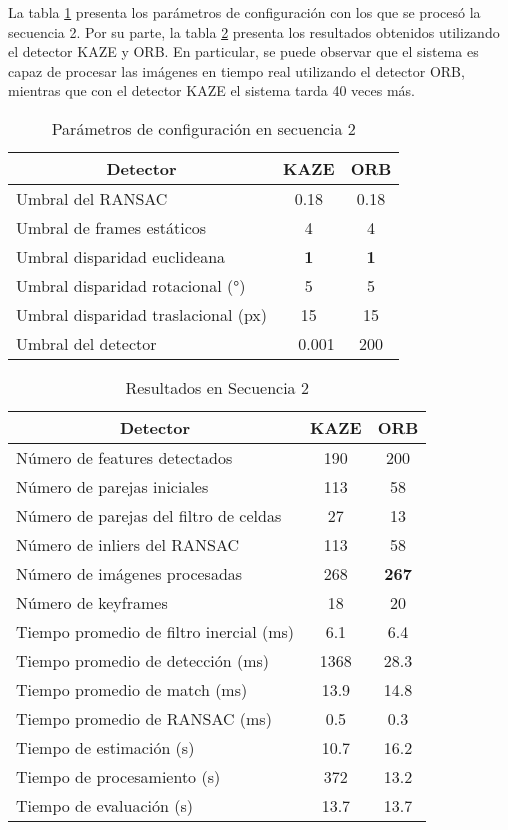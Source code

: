 La tabla \ref{Tabla/Parametros/Secuencia2} presenta los parámetros de configuración con los que se procesó la secuencia 2. Por su parte, la tabla \ref{Tabla/Resultados/Secuencia2} presenta los resultados obtenidos utilizando el detector KAZE y ORB. En particular, se puede observar que el sistema es capaz de procesar las imágenes en tiempo real utilizando el detector ORB, mientras que con el detector KAZE el sistema tarda 40 veces más. 


\begin{table}[H]
	\centering
	\caption{Parámetros de configuración  en secuencia 2}
	\begin{tabular}{|l|c|c|}
		\hline
		\multicolumn{1}{|c|}{\textbf{Detector}} & \textbf{KAZE} & \textbf{ORB} \\ \hline
		Umbral del RANSAC & 0.18 & 0.18 \\ \hline
		Umbral de frames estáticos & 4 & 4 \\ \hline
		Umbral disparidad euclideana & \textbf{1} & \textbf{1} \\ \hline
		Umbral disparidad rotacional (°) & 5 & 5 \\ \hline
		Umbral disparidad traslacional (px) & 15 & 15 \\ \hline
		Umbral del detector & \multicolumn{1}{r|}{0.001} & 200 \\ \hline
	\end{tabular}
	\label{Tabla/Parametros/Secuencia2}
\end{table}

\begin{table}[H]
	\centering
	\caption{Resultados en Secuencia 2}
	\begin{tabular}{|l|c|c|}
		\hline
		\multicolumn{1}{|c|}{\textbf{Detector}} & \textbf{KAZE} & \textbf{ORB} \\ \hline
		Número de features detectados & 190 & 200 \\ \hline
		Número de parejas iniciales & 113 & 58 \\ \hline
		Número de parejas del filtro de celdas & 27 & 13 \\ \hline
		Número de inliers del RANSAC & 113 & 58 \\ \hline
		Número de imágenes procesadas & 268 & \textbf{267} \\ \hline
		Número de keyframes & 18 & 20 \\ \hline
		Tiempo promedio de filtro inercial (ms) & 6.1 & 6.4 \\ \hline
		Tiempo promedio de detección  (ms) & 1368 & 28.3 \\ \hline
		Tiempo promedio de match (ms) & 13.9 & 14.8 \\ \hline
		Tiempo promedio de RANSAC (ms) & 0.5 & 0.3 \\ \hline
		Tiempo de estimación (s) & 10.7 & 16.2 \\ \hline
		Tiempo de  procesamiento (s) & 372 & 13.2 \\ \hline
		Tiempo de evaluación (s) & 13.7 & 13.7 \\ \hline
	\end{tabular}
	\label{Tabla/Resultados/Secuencia2}
\end{table}

